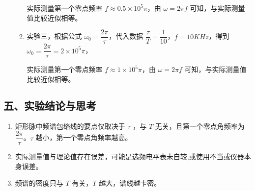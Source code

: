 \documentclass[dvipsnames, svgnames,a4paper,11pt]{article}
\begin{document}
\begin{enumerate}
\begin{enumerate}
          实际测量第一个零点频率 $f \approx 0.5 \times 10^5 \pi$，由 $\omega = 2\pi f$ 可知，与实际测量值比较近似相等。
        \item 实验三，根据公式 $\omega_0 = \dfrac{2\pi}{\tau}$，代入数据 $\dfrac{\tau}{T} = \dfrac{1}{10}$，$f = 10KHz$，得到 $\omega_0 = \dfrac{2\pi}{\tau} = 2 \times 10^5 \pi$，
        
          实际测量第一个零点频率 $f \approx 1 \times 10^5 \pi$，由 $\omega = 2\pi f$ 可知，与实际测量值比较近似相等。
      \end{enumerate}
  \end{enumerate}

\subsection*{五、实验结论与思考}
  \begin{enumerate}
    \item 矩形脉中频谱包络线的要点仅取决于 $\tau$ ，与 $T$ 无关，且第一个零点角频率为 $\dfrac{2\pi}{\tau}$。$\tau$ 越小，第一个零点角频率越高。
    \item 实际测量值与理论值存在误差，可能是选频电平表未自较,或使用不当或仪器本身误差。
    \item 频谱的密度只与 $T$ 有关，$T$ 越大，谱线越卡密。
  \end{enumerate}
\end{document}
